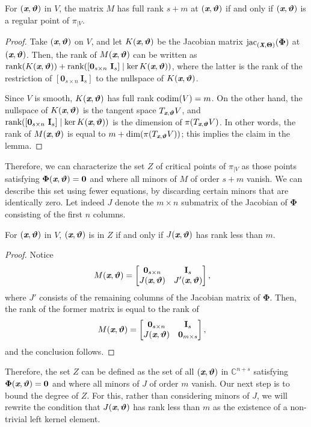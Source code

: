 \documentclass[sigconf]{acmart}
\def\Xb{\textit{\textbf{X}}}
\def\Thetab{\bm{\Theta}}
\def\thetab{\bm{\vartheta}}
\def\xb{\textit{\textbf{x}}}
\def\C{\mathbb{C}}
\def\jac{ \textrm{jac}}
\def\dt{s}
\def\bbm{\begin{bmatrix}}
\def\ebm{\end{bmatrix}}
\begin{document}
\begin{lemma} 
  For $(\xb,\thetab)$ in $V$, the matrix $M$ has full rank $\dt+m$ at
  $(\xb,\thetab)$ if and only if $(\xb,\thetab)$ is a regular point of
  $\pi_{|V}.$
\end{lemma}
\begin{proof}
  Take $(\xb,\thetab)$ on $V$, and let $K(\xb,\thetab)$ be the
  Jacobian matrix $\jac_{(\Xb,\Thetab)}(\bm\Phi)$ at $(\xb,\thetab)$.
  Then, the rank of $M(\xb,\thetab)$ can be written as
  $\textup{rank}(K(\xb,\thetab)) + \textup{rank}([\textbf{0}_{\dt
      \times n}~\textbf{I}_{\dt}] \mid \ker K(\xb,\thetab))$, where
  the latter is the rank of the restriction of $[\textbf{0}_{\dt
      \times n}~\textbf{I}_{\dt}]$ to the nullspace of
  $K(\xb,\thetab)$.

  Since $V$ is smooth, $K(\xb,\thetab)$ has full rank ${\rm codim} (V)
  = m$. On the other hand, the nullspace of $K(\xb,\thetab)$ is the
  tangent space $T_{\xb,\thetab} V$, and
  $\textup{rank}([\textbf{0}_{\dt \times n}~\textbf{I}_{\dt}] \mid
  \ker K(\xb,\thetab))$ is the dimension of $\pi(T_{\xb,\thetab} V)$.
  In other words, the rank of $M(\xb,\thetab)$ is equal to
  $m+\dim(\pi(T_{\xb,\thetab} V))$; this implies the claim in the lemma.
\end{proof}


Therefore, we can characterize the set $Z$ of critical points of
$\pi_{|V}$ as those points satisfying $\bm\Phi(\xb,\thetab)=\bm 0$ and
where all minors of $M$ of order $\dt+m$ vanish. We can describe this
set using fewer equations, by discarding certain minors that are
identically zero. Let indeed $J$ denote the $m \times n$ submatrix of
the Jacobian of $\bm\Phi$ consisting of the first $n$ columns.
\begin{lemma} 
  For $(\xb,\thetab)$ in $V$, $(\xb,\thetab)$ is in $Z$ if and only if
  $J(\xb,\thetab)$ has rank less than $m$.
\end{lemma}
\begin{proof}
Notice 
%
\begin{align*}
M(\xb,\thetab)&= 
\bbm 
\textbf{0}_{\dt \times n} &\textbf{I}_{\dt} \\
J(\xb,\thetab)     &J'(\xb,\thetab)
\ebm,
\end{align*}
where $J'$ consists of the remaining columns of the Jacobian matrix of
$\bm\Phi$.  Then, the rank of the former matrix is equal to the rank
of
\begin{align*}
M(\xb,\thetab)&= 
\bbm 
\textbf{0}_{\dt \times n} &\textbf{I}_{\dt} \\
J(\xb,\thetab)     & \bm 0_{m \times s}
\ebm,
\end{align*}
and the conclusion follows.
\end{proof}
Therefore, the set $Z$ can be defined as the set of all
$(\xb,\thetab)$ in $\C^{n+\dt}$ satisfying $\bm\Phi(\xb,\thetab)=\bm
0$ and where all minors of $J$ of order $m$ vanish. Our next step is
to bound the degree of $Z$. For this, rather than considering minors
of $J$, we will rewrite the condition that $J(\xb,\thetab)$ has rank
less than $m$ as the existence of a non-trivial left kernel element.
\end{document}
